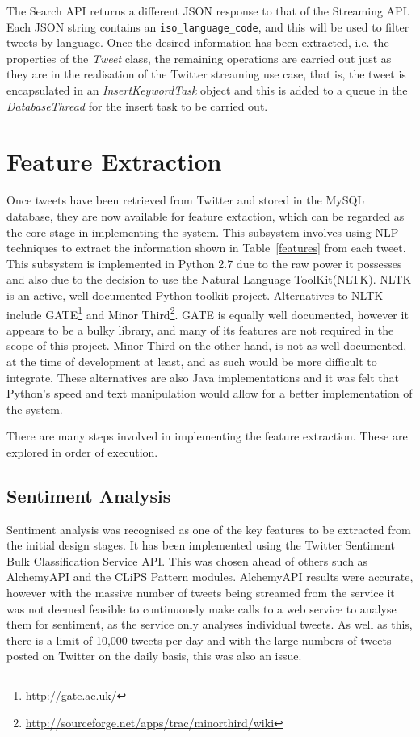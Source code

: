 The Search API returns a different JSON response to that of the Streaming API. Each JSON string contains an \texttt{iso\_language\_code}, and this will be used to filter tweets by language. Once the desired information has been extracted, i.e. the properties of the \emph{Tweet} class, the remaining operations are carried out just as they are in the realisation of the Twitter streaming use case, that is, the tweet is encapsulated in an \emph{InsertKeywordTask} object and this is added to a queue in the \emph{DatabaseThread} for the insert task to be carried out.



\python
\section{Feature Extraction}
Once tweets have been retrieved from Twitter and stored in the MySQL database, they are now available for feature extaction, which can be regarded as the core stage in implementing the system. This subsystem involves using NLP techniques to extract the information shown in Table~\ref{features} from each tweet. This subsystem is implemented in Python 2.7 due to the raw power it possesses and also due to the decision to use the Natural Language ToolKit(NLTK)\cite{NLTK}. NLTK is an active, well documented Python toolkit project. Alternatives to NLTK include GATE\footnote{\url{http://gate.ac.uk/}} and Minor Third\footnote{\url{http://sourceforge.net/apps/trac/minorthird/wiki}}. GATE is equally well documented, however it appears to be a bulky library, and many of its features are not required in the scope of this project. Minor Third on the other hand, is not as well documented, at the time of development at least, and as such would be more difficult to integrate. These alternatives are also Java implementations and it was felt that Python's speed and text manipulation would allow for a better implementation of the system.

There are many steps involved in implementing the feature extraction. These are explored in order of execution.

\subsection{Sentiment Analysis}
Sentiment analysis was recognised as one of the key features to be extracted from the initial design stages. It has been implemented using the Twitter Sentiment Bulk Classification Service API. This was chosen ahead of others such as AlchemyAPI\cite{alchemyapi} and the CLiPS Pattern modules. AlchemyAPI results were accurate, however with the massive number of tweets being streamed from the service it was not deemed feasible to continuously make calls to a web service to analyse them for sentiment, as the service only analyses individual tweets. As well as this, there is a limit of 10,000 tweets per day and with the large numbers of tweets posted on Twitter on the daily basis, this was also an issue.

